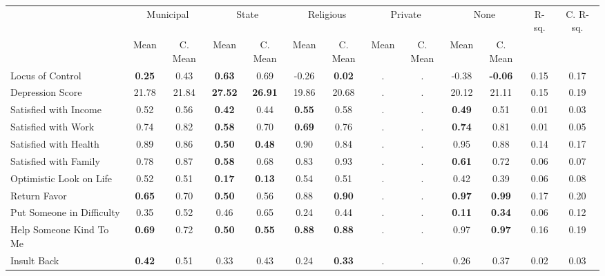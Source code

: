 \begin{tabular}{l c c c c c c c c c c c c}
\toprule
& \multicolumn{2}{c}{Municipal} & \multicolumn{2}{c}{State} & \multicolumn{2}{c}{Religious} & \multicolumn{2}{c}{Private} & \multicolumn{2}{c}{None} & R-sq. & C. R-sq. \\
& \scriptsize Mean & \scriptsize C. Mean & \scriptsize Mean & \scriptsize C. Mean & \scriptsize Mean & \scriptsize C. Mean & \scriptsize Mean & \scriptsize C. Mean & \scriptsize Mean & \scriptsize C. Mean & & \\
\midrule
Locus of Control & \textbf{     0.25} & 0.43 & \textbf{     0.63} & 0.69 &     -0.26 & \textbf{     0.02} &         . & . &     -0.38 & \textbf{    -0.06} &      0.15 &      0.17 \\
Depression Score &     21.78 & 21.84 & \textbf{    27.52} & \textbf{    26.91} &     19.86 & 20.68 &         . & . &     20.12 & 21.11 &      0.15 &      0.19 \\
Satisfied with Income &      0.52 & 0.56 & \textbf{     0.42} & 0.44 & \textbf{     0.55} & 0.58 &         . & . & \textbf{     0.49} & 0.51 &      0.01 &      0.03 \\
Satisfied with Work &      0.74 & 0.82 & \textbf{     0.58} & 0.70 & \textbf{     0.69} & 0.76 &         . & . & \textbf{     0.74} & 0.81 &      0.01 &      0.05 \\
Satisfied with Health &      0.89 & 0.86 & \textbf{     0.50} & \textbf{     0.48} &      0.90 & 0.84 &         . & . &      0.95 & 0.88 &      0.14 &      0.17 \\
Satisfied with Family &      0.78 & 0.87 & \textbf{     0.58} & 0.68 &      0.83 & 0.93 &         . & . & \textbf{     0.61} & 0.72 &      0.06 &      0.07 \\
Optimistic Look on Life &      0.52 & 0.51 & \textbf{     0.17} & \textbf{     0.13} &      0.54 & 0.51 &         . & . &      0.42 & 0.39 &      0.06 &      0.08 \\
Return Favor & \textbf{     0.65} & 0.70 & \textbf{     0.50} & 0.56 &      0.88 & \textbf{     0.90} &         . & . & \textbf{     0.97} & \textbf{     0.99} &      0.17 &      0.20 \\
Put Someone in Difficulty &      0.35 & 0.52 &      0.46 & 0.65 &      0.24 & 0.44 &         . & . & \textbf{     0.11} & \textbf{     0.34} &      0.06 &      0.12 \\
Help Someone Kind To Me & \textbf{     0.69} & 0.72 & \textbf{     0.50} & \textbf{     0.55} & \textbf{     0.88} & \textbf{     0.88} &         . & . &      0.97 & \textbf{     0.97} &      0.16 &      0.19 \\
Insult Back & \textbf{     0.42} & 0.51 &      0.33 & 0.43 &      0.24 & \textbf{     0.33} &         . & . &      0.26 & 0.37 &      0.02 &      0.03 \\
\bottomrule
\end{tabular}
